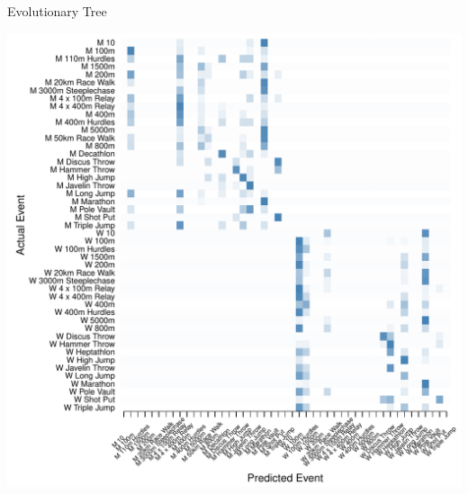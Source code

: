 \documentclass[landscape, paperwidth=42in, paperheight=36in,
fontscale=.35, margin=1in]{baposter}
\begin{document}
\begin{poster}
{\begin{center}
\begin{minipage}{0.45\textwidth}
\begin{center}
    \end{center}
  \end{minipage}


  Evolutionary Tree \\
  \begin{minipage}{0.45\textwidth}
    \begin{center}
      \includegraphics[scale=0.27]{../graphics/athletesEV-trn.pdf}
    \end{center}
  \end{minipage}
  \hspace{0.05\textwidth}
  \begin{minipage}{0.45\textwidth}
    \begin{center}

\end{center}
\end{minipage}
\end{center}}
\end{poster}
\end{document}
